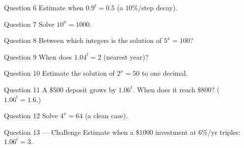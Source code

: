 \documentclass[11pt]{article}
\begin{document}
\begin{qbox}{Question 6}
Estimate when $0.9^{t}=0.5$ (a $10\%$/step decay).\workspace{2.4cm}
\end{qbox}

\begin{qbox}{Question 7}
Solve $10^{x}=1000$.\workspace{2.4cm}
\end{qbox}

\begin{qbox}{Question 8}
Between which integers is the solution of $5^{x}=100$?\workspace{2.4cm}
\end{qbox}

\begin{qbox}{Question 9}
When does $1.04^{t}=2$ (nearest year)?\workspace{2.4cm}
\end{qbox}

\begin{qbox}{Question 10}
Estimate the solution of $2^{x}=50$ to one decimal.\workspace{2.4cm}
\end{qbox}

\begin{qbox}{Question 11}
A $\$500$ deposit grows by $1.06^{t}$. When does it reach $\$800$? ($1.06^{t}=1.6$.)\workspace{2.4cm}
\end{qbox}

\begin{qbox}{Question 12}
Solve $4^{x}=64$ (a clean case).\workspace{2.4cm}
\end{qbox}

\begin{qbox}{Question 13 --- Challenge}
Estimate when a $\$1000$ investment at $6\%$/yr triples: $1.06^{t}=3$.\workspace{3.2cm}
\end{qbox}

\clearpage
{}
\end{document}
